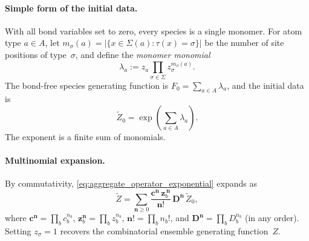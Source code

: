 \documentclass[11pt]{amsart}
\newcommand{\GFspecies}{F}
\newcommand{\GFensemble}{Z}
\theoremstyle{definition}
\theoremstyle{plain}
\theoremstyle{remark}
\begin{document}
\paragraph{Simple form of the initial data.}
With all bond variables set to zero, every species is a single monomer.
For atom type $a\in A$, let $m_\sigma(a) = |\{x\in\Sigma(a):\tau(x)=\sigma\}|$ be the number of site positions of type~$\sigma$, and define the \emph{monomer monomial}
\begin{equation}\label{eq:monomer_monomial}
\lambda_a := z_a\prod_{\sigma\in\Sigma} z_\sigma^{m_\sigma(a)}.
\end{equation}
The bond-free species generating function is $\GFspecies_0 = \sum_{a\in A}\lambda_a$, and the initial data is
\begin{equation}\label{eq:Z0_explicit}
\widetilde{\GFensemble}_0 = \exp\!\left(\sum_{a\in A}\lambda_a\right).
\end{equation}
The exponent is a finite sum of monomials.

\paragraph{Multinomial expansion.}
By commutativity, \eqref{eq:aggregate_operator_exponential} expands as
\begin{equation}\label{eq:multinomial_operator_expansion}
\widetilde{\GFensemble}
= \sum_{\mathbf{n}\ge 0}
\frac{\mathbf{c}^{\mathbf{n}}\,\mathbf{z}_b^{\,\mathbf{n}}}{\mathbf{n}!}\,\mathbf{D}^{\mathbf{n}}\,\widetilde{\GFensemble}_0,
\end{equation}
where $\mathbf{c}^{\mathbf{n}} = \prod_b c_b^{n_b}$, $\mathbf{z}_b^{\mathbf{n}} = \prod_b z_b^{n_b}$, $\mathbf{n}! = \prod_b n_b!$,
and $\mathbf{D}^{\mathbf{n}} = \prod_b D_b^{n_b}$ (in any order).
Setting $z_\sigma=1$ recovers the combinatorial ensemble generating function~$\GFensemble$.
\end{document}

